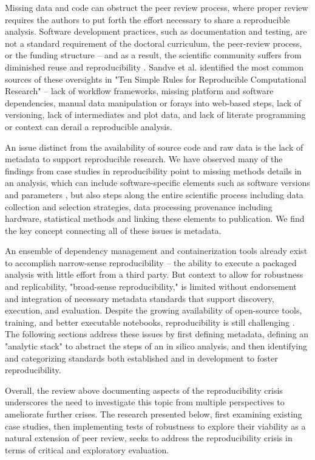 \documentclass{drexelthesis}
\begin{document}
Missing data and code can obstruct the peer review process, where proper review requires the authors to put forth the effort necessary to share a reproducible analysis. Software development practices, such as documentation and testing, are not a standard requirement of the doctoral curriculum, the peer-review process, or the funding structure – and as a result, the scientific community suffers from diminished reuse and reproducibility \cite{Nust2018-wx}. Sandve et al. \cite{Sandve2013-yv} identified the most common sources of these oversights in "Ten Simple Rules for Reproducible Computational Research" – lack of workflow frameworks, missing platform and software dependencies, manual data manipulation or forays into web-based steps, lack of versioning, lack of intermediates and plot data, and lack of literate programming or context can derail a reproducible analysis.

An issue distinct from the availability of source code and raw data is the lack of metadata to support reproducible research. We have observed many of the findings from case studies in reproducibility point to missing methods details in an analysis, which can include software-specific elements such as software versions and parameters \cite{Collberg2014-cj}, but also steps along the entire scientific process including data collection and selection strategies, data processing provenance including hardware, statistical methods and linking these elements to publication. We find the key concept connecting all of these issues is metadata.

An ensemble of dependency management and containerization tools already exist to accomplish narrow-sense reproducibility \cite{Piccolo2016-kd} – the ability to execute a packaged analysis with little effort from a third party. But context to allow for robustness and replicability, "broad-sense reproducibility," is limited without endorsement and integration of necessary metadata standards that support discovery, execution, and evaluation. Despite the growing availability of open-source tools, training, and better executable notebooks, reproducibility is still challenging \cite{FitzJohn_undated-bq}. The following sections address these issues by first defining metadata, defining an "analytic stack" to abstract the steps of an in silico analysis, and then identifying and categorizing standards both established and in development to foster reproducibility.

Overall, the review above documenting aspects of the reproducibility crisis underscores the need to investigate this topic from multiple perspectives to ameliorate further crises. The research presented below, first examining existing case studies, then implementing tests of robustness to explore their viability as a natural extension of peer review, seeks to address the reproducibility crisis in terms of critical and exploratory evaluation.
\end{document}
